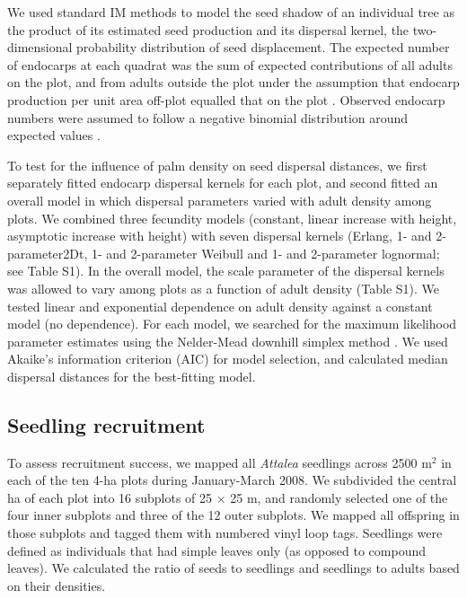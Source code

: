 \documentclass[b5paper,justified]{tufte-book} %
\begin{document}
\begin{fullwidth}
We used standard IM methods \citep{Ribbens1994, Muller-Landau2008} to model the seed shadow of an individual tree as the product of its estimated seed production and its dispersal kernel, the two-dimensional probability distribution of seed displacement. The expected number of endocarps at each quadrat was the sum of expected contributions of all adults on the plot, and from adults outside the plot under the assumption that endocarp production per unit area off-plot equalled that on the plot \citep{Muller-Landau2008}. Observed endocarp numbers were assumed to follow a negative binomial distribution around expected values \citep{Clark1999}.

To test for the influence of palm density on seed dispersal distances, we first separately fitted endocarp dispersal kernels for each plot, and second fitted an overall model in which dispersal parameters varied with adult density among plots. We combined three fecundity models (constant, linear increase with height, asymptotic increase with height) with seven dispersal kernels (Erlang, 1- and 2-parameter2Dt, 1- and 2-parameter Weibull and 1- and 2-parameter lognormal; see Table S1)\citep{Ribbens1994, Clark1999, Klein2006, Jongejans2008}. In the overall model, the scale parameter of the dispersal kernels was allowed to vary among plots as a function of adult density (Table S1). We tested linear and exponential dependence on adult density against a constant model (no dependence). For each model, we searched for the maximum likelihood parameter estimates using the Nelder-Mead downhill simplex method \citep{Nelder1965}. We used Akaike's information criterion (AIC) for model selection, and calculated median dispersal distances for the best-fitting model.

\subsection{Seedling recruitment}
To assess recruitment success, we mapped all \textit{Attalea} seedlings across 2500 m$^2$ in each of the ten 4-ha plots during January-March 2008. We subdivided the central ha of each plot into 16 subplots of 25 $\times$ 25 m, and randomly selected one of the four inner subplots and three of the 12 outer subplots. We mapped all offspring in those subplots and tagged them with numbered vinyl loop tags. Seedlings were defined as individuals that had simple leaves only (as opposed to compound leaves). We calculated the ratio of seeds to seedlings and seedlings to adults based on their densities.


\end{fullwidth}
\end{document}
